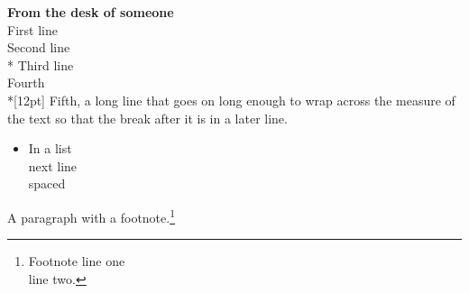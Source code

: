 \documentclass{article}
\begin{document}
\textbf{From the desk of someone}\\[22pt]
First line\\
Second line \\*
Third line\\ [3pt plus 1pt]
Fourth \\*[12pt] Fifth, a long line that goes on long enough to wrap across the measure of the text so that the break after it is in a later line.\\
\begin{itemize}
\item In a list\\ next line\\[4pt] spaced
\end{itemize}
A paragraph with a footnote.\footnote{Footnote line one\\ line two.}
\end{document}
